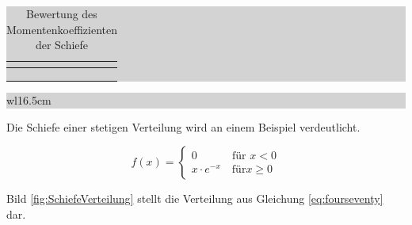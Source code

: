 \begin{table}[H]
\setlength{\arrayrulewidth}{.1em}
\caption{Bewertung des Momentenkoeffizienten der Schiefe}
\setlength{\fboxsep}{0pt}%
\colorbox{lightgray}{%
%
\begin{tabular}{| c | c |}
\hline
\parbox[c][0.3in][c]{3.3in}{\smallskip\centering\textbf{\selectfont{Kennwert}}} & 
\parbox[c][0.3in][c]{3.3in}{\smallskip\centering\textbf{\selectfont{Symmetrieeigenschaft}}}\\ \hline


\parbox[c][0.3in][c]{3.3in}{\centering{}} & 
\parbox[c][0.3in][c]{3.3in}{\centering{}\selectfont{Rechtsschiefe Verteilung}} \\
\hline

\parbox[c][0.3in][c]{3.3in}{\centering{}} & 
\parbox[c][0.3in][c]{3.3in}{\centering{}\selectfont{Symmetrische Verteilung}} \\
\hline

\parbox[c][0.3in][c]{3.3in}{\centering{}} & 
\parbox[c][0.3in][c]{3.3in}{\centering{}\selectfont{Linksschiefe Verteilung}} \\
\hline

\end{tabular}%
}
\label{tab:foursix}
\end{table}

\noindent
\colorbox{lightgray}{%
%
\renewcommand\arraystretch{0.6}%
\begin{tabular}{ wl{16.5cm} }
{\selectfont{Beispiel: Schiefe einer Verteilung}}
\end{tabular}%
}\medskip 

\noindent Die Schiefe einer stetigen Verteilung wird an einem Beispiel verdeutlicht.

\begin{equation}\label{eq:fourseventy}
f(x)=\left\{\begin{array}{ll}
{0 \qquad \;\;\; \text{ für } x<0} \\
{x\cdot e^{-x}  \quad \text{für} x\ge 0} \end{array}\right.
\end{equation}

\noindent Bild \ref{fig:SchiefeVerteilung} stellt die Verteilung aus Gleichung \eqref{eq:fourseventy} dar.

